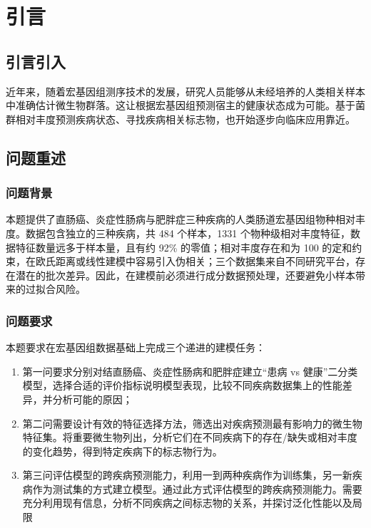 \section{引言}

\subsection{引言引入}

近年来，随着宏基因组测序技术的发展，研究人员能够从未经培养的人类相关样本中准确估计微生物群落。这让根据宏基因组预测宿主的健康状态成为可能。基于菌群相对丰度预测疾病状态、寻找疾病相关标志物，也开始逐步向临床应用靠近。

\subsection{问题重述}

\subsubsection{问题背景}

本题提供了直肠癌、炎症性肠病与肥胖症三种疾病的人类肠道宏基因组物种相对丰度。数据包含独立的三种疾病，共 484 个样本，1331 个物种级相对丰度特征，数据特征数量远多于样本量，且有约 92\% 的零值；相对丰度存在和为 100 的定和约束，在欧氏距离或线性建模中容易引入伪相关；三个数据集来自不同研究平台，存在潜在的批次差异。因此，在建模前必须进行成分数据预处理，还要避免小样本带来的过拟合风险。

\subsubsection{问题要求}

本题要求在宏基因组数据基础上完成三个递进的建模任务：

\begin{enumerate}
\item 第一问要求分别对结直肠癌、炎症性肠病和肥胖症建立“患病 vs 健康”二分类模型，选择合适的评价指标说明模型表现，比较不同疾病数据集上的性能差异，并分析可能的原因；
\item 第二问需要设计有效的特征选择方法，筛选出对疾病预测最有影响力的微生物特征集。将重要微生物列出，分析它们在不同疾病下的存在/缺失或相对丰度的变化趋势，得到特定疾病下的标志物行为。
\item 第三问评估模型的跨疾病预测能力，利用一到两种疾病作为训练集，另一新疾病作为测试集的方式建立模型。通过此方式评估模型的跨疾病预测能力。需要充分利用现有信息，分析不同疾病之间标志物的关系，并探讨泛化性能以及局限
\end{enumerate}


